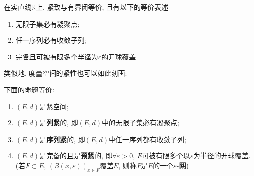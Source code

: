      \begin{Example}
     在实直线$ \mathbb{R} $上, 紧致与有界闭等价, 且有以下的等价表述:
     \begin{enumerate}[(1)]
     \item 无限子集必有凝聚点;
     \item 任一序列必有收敛子列;
     \item 完备且可被有限多个半径为$ \varepsilon $的开球覆盖.
     \end{enumerate}
     \end{Example}
     
     类似地, 度量空间的紧性也可以如此刻画:
     
     \begin{Theorem}[紧等价]\label{thm:紧等价}
     下面的命题等价:
     \begin{enumerate}[(1)]
     \item $ (E,d) $是紧空间;
     \item $ (E,d) $是\textbf{列紧}的, 即$ (E,d) $中的无限子集必有凝聚点;
     \item $ (E,d) $是\textbf{序列紧}的, 即$ (E,d) $中任一序列都有收敛子列;
     \item $ (E,d) $是完备的且是\textbf{预紧}的, 即$ \forall\varepsilon>0 $, $ E $可被有限多个以$ \varepsilon $为半径的开球覆盖. (若$ F\subset E $, $ (B(x,\varepsilon))_{x\in F} $覆盖$ E $, 则称$ F $是$ E $的一个$ \varepsilon $-\textbf{网})
     \end{enumerate}
     \end{Theorem}

